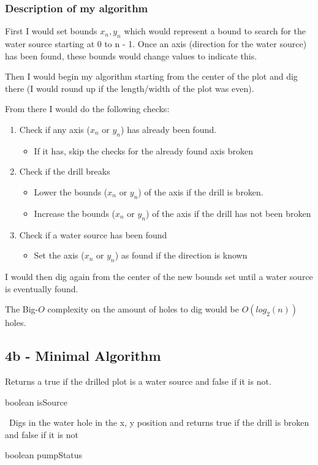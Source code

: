 \documentclass[oneside, a4paper]{article}
\begin{document}
\subsubsection*{Description of my algorithm}
First I would set bounds $x_n, y_n$ which would represent a bound to search for the water source starting at 0 to n - 1. Once an axis (direction for the water source) has been found, these bounds would change values to indicate this.

Then I would begin my algorithm starting from the center of the plot and dig there (I would round up if the length/width of the plot was even). 

From there I would do the following checks:
\begin{enumerate}
    \item Check if any axis ($x_n$ or $y_n$) has already been found. 
    \begin{itemize}
        \item If it has, skip the checks for the already found axis broken
    \end{itemize}
    \item Check if the drill breaks
        \begin{itemize}
            \item Lower the bounds ($x_n$ or $y_n$) of the axis if the drill is broken. 
            \item Increase the bounds ($x_n$ or $y_n$) of the axis if the drill has not been broken
        \end{itemize}
    \item Check if a water source has been found
    \begin{itemize}
        \item Set the axis ($x_n$ or $y_n$) as found if the direction is known
    \end{itemize}
\end{enumerate}

I would then dig again from the center of the new bounds set until a water source is eventually found.

The Big-$O$ complexity on the amount of holes to dig would be $O(log_2(n))$ holes.

\subsection*{4b - Minimal Algorithm}

Returns a true if the drilled plot is a water source and false if it is not.
\begin{algorithmic}[1]
        \State \Return boolean isSource
    \EndFunction
\end{algorithmic}
\
Digs in the water hole in the x, y position and returns true if the drill is broken and false if it is not
\begin{algorithmic}[1]
        \State \Return boolean pumpStatus
    \EndFunction
\end{algorithmic}
\end{document}
